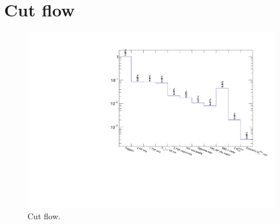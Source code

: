 \section{Cut flow}\label{sec:cutFlow}

\begin{figure}[ht!]
\centering%
\includegraphics[width=0.85\linewidth,page=1]{graphics/eventSelection/CutFlow.pdf}%
\caption{Cut flow.}\label{fig:CutFlow}%
\end{figure}
